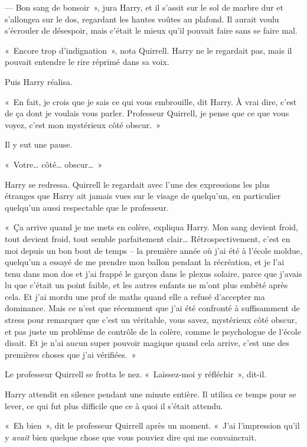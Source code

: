 --- Bon sang de bonsoir~», jura Harry, et il s'assit sur le sol de marbre dur et s'allongea sur le dos, regardant les hautes voûtes au plafond.
Il aurait voulu s'écrouler de désespoir, mais c'était le mieux qu'il pouvait faire sans se faire mal.

«~Encore trop d'indignation~», nota Quirrell.
Harry ne le regardait pas, mais il pouvait entendre le rire réprimé dans sa voix.

Puis Harry réalisa.

«~En fait, je crois que je sais ce qui vous embrouille, dit Harry.
À vrai dire, c'est de ça dont je voulais vous parler.
Professeur Quirrell, je pense que ce que vous voyez, c'est mon mystérieux côté obscur.~»

Il y eut une pause.

«~Votre… côté… obscur…~»

Harry se redressa.
Quirrell le regardait avec l'une des expressions les plus étranges que Harry ait jamais vues sur le visage de quelqu'un, en particulier quelqu'un aussi respectable que le professeur.

«~Ça arrive quand je me mets en colère, expliqua Harry.
Mon sang devient froid, tout devient froid, tout semble parfaitement clair…
Rétrospectivement, c'est en moi depuis un bon bout de temps -- la première année où j'ai été à l'école moldue, quelqu'un a essayé de me prendre mon ballon pendant la récréation, et je l'ai tenu dans mon dos et j'ai frappé le garçon dans le plexus solaire, parce que j'avais lu que c'était un point faible, et les autres enfants ne m'ont plus embêté après cela.
Et j'ai mordu une prof de maths quand elle a refusé d'accepter ma dominance.
Mais ce n'est que récemment que j'ai été confronté à suffisamment de stress pour remarquer que c'est un véritable, vous savez, mystérieux côté obscur, et pas juste un problème de contrôle de la colère, comme le psychologue de l'école disait.
Et je n'ai aucun super pouvoir magique quand cela arrive, c'est une des premières choses que j'ai vérifiées.~»


Le professeur Quirrell se frotta le nez.
«~Laissez-moi y réfléchir~», dit-il.

Harry attendit en silence pendant une minute entière.
Il utilisa ce temps pour se lever, ce qui fut plus difficile que ce à quoi il s'était attendu.

«~Eh bien~», dit le professeur Quirrell après un moment.
«~J'ai l'impression qu'il y \emph{avait} bien quelque chose que vous pouviez dire qui me convaincrait.

